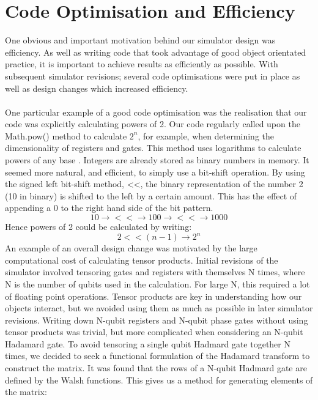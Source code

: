 \documentclass[12pt]{report}
\begin{document}
\section{Code Optimisation and Efficiency}
One obvious and important motivation behind our simulator design was efficiency.  As well as writing code that took advantage of good object orientated practice, it is important to achieve results  as efficiently as possible.  With subsequent simulator revisions; several code optimisations were put in place as well as design changes which increased efficiency.
\\ \\
One particular example of a good code optimisation was the realisation that our code was explicitly calculating powers of 2. Our code regularly called upon the Math.pow() method to calculate $2^n$, for example, when determining the dimensionality of registers and gates. This method uses logarithms to calculate powers of any base \cite{12}. Integers are already stored as binary numbers in memory. It seemed more natural, and efficient, to simply use a bit-shift operation.  By using the signed left bit-shift method, <<, the binary representation of the number 2 (10 in binary) is shifted to the left by a certain amount.  This has the effect of appending a 0 to the right hand side of the bit pattern.
\begin{equation}
10 \rightarrow << \rightarrow 100 \rightarrow << \rightarrow 1000
\end{equation}
Hence powers of 2 could be calculated by writing:
\begin{equation}
2 << (n-1) \rightarrow 2^n
\end{equation}
An example of an overall design change was motivated by the large computational cost of calculating tensor products.  Initial revisions of the simulator involved tensoring gates and registers with themselves N times, where N is the number of qubits used in the calculation.  For large N, this required a lot of floating point operations.  Tensor products are key in understanding how our objects interact, but we avoided using them as much as possible in later simulator revisions.  Writing down N-qubit registers and N-qubit phase gates without using tensor products was trivial, but more complicated when considering an N-qubit Hadamard gate.  To avoid tensoring a single qubit Hadmard gate together N times, we decided to seek a functional formulation of the Hadamard transform to construct the matrix.  It was found that the rows of a N-qubit Hadmard gate are defined by the Walsh functions\cite{13}.  This gives us a method for generating elements of the matrix:
\end{document}
